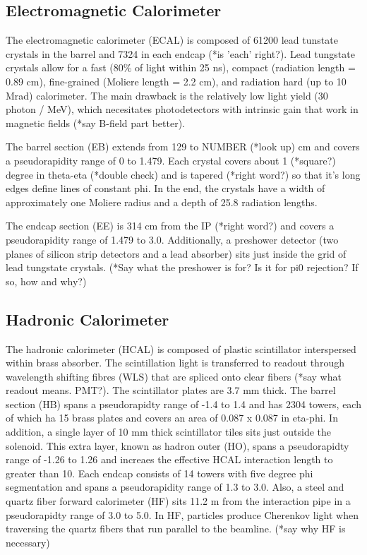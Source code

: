 \documentclass[12pt]{article}
\begin{document}
\subsection{Electromagnetic Calorimeter}
        The electromagnetic calorimeter (ECAL) is composed of 61200 lead tunstate crystals in the barrel and 7324 in each endcap (*is 'each' right?). Lead tungstate crystals allow for a fast (80\% of light within 25 ns), compact (radiation length = 0.89 cm), fine-grained (Moliere length = 2.2 cm), and radiation hard (up to 10 Mrad) calorimeter. The main drawback is the relatively low light yield (30 photon / MeV), which necesitates photodetectors with intrinsic gain that work in magnetic fields (*say B-field part better). 

        The barrel section (EB) extends from 129 to NUMBER (*look up) cm and covers a pseudorapidity range of 0 to 1.479. Each crystal covers about 1 (*square?) degree in theta-eta (*double check) and is tapered (*right word?) so that it's long edges define lines of constant phi. In the end, the crystals have a width of approximately one Moliere radius and a depth of 25.8 radiation lengths.

        The endcap section (EE) is 314 cm from the IP (*right word?) and covers a pseudorapidity range of 1.479 to 3.0. Additionally, a preshower detector (two planes of silicon strip detectors and a lead absorber) sits just inside the grid of lead tungstate crystals. (*Say what the preshower is for? Is it for pi0 rejection? If so, how and why?)

\subsection{Hadronic Calorimeter}
        The hadronic calorimeter (HCAL) is composed of plastic scintillator interspersed within brass absorber. The scintillation light is transferred to readout through wavelength shifting fibres (WLS) that are spliced onto clear fibers (*say what readout means. PMT?). The scintillator plates are 3.7 mm thick.
        The barrel section (HB) spans a pseudorapidty range of -1.4 to 1.4 and has 2304 towers, each of which ha 15 brass plates and covers an area of 0.087 x 0.087 in eta-phi. In addition, a single layer of 10 mm thick scintillator tiles sits just outside the solenoid. This extra layer, known as hadron outer (HO), spans a pseudorapidty range of -1.26 to 1.26 and increaes the effective HCAL interaction length to greater than 10.
        Each endcap consists of 14 towers with five degree phi segmentation and spans a pseudorapidity range of 1.3 to 3.0. Also, a steel and quartz fiber forward calorimeter (HF) sits 11.2 m from the interaction pipe in a pseudorapidty range of 3.0 to 5.0. In HF, particles produce Cherenkov light when traversing the quartz fibers that run parallel to the beamline. (*say why HF is necessary)
\end{document}
